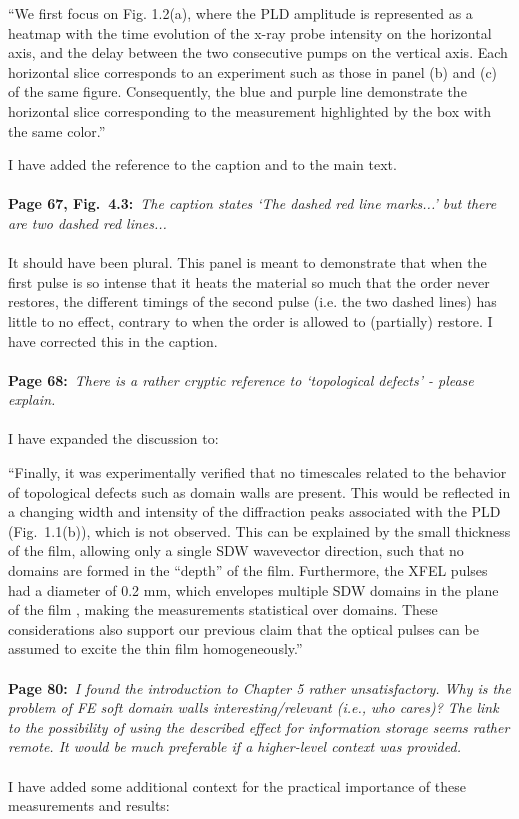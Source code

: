 \documentclass[phd, titlesmallcaps,foronline,oneside]{SNSthesis}
\begin{document}
``We first focus on Fig. 1.2(a), where
the PLD amplitude is represented as a heatmap with the time evolution of the x-ray probe intensity on the horizontal axis, and the delay between the two consecutive pumps on the vertical axis. Each horizontal slice corresponds to an experiment such as those in panel (b) and (c) of the same figure. Consequently, the blue and purple line demonstrate the horizontal slice corresponding to the measurement highlighted by the box with the same color.''

I have added the reference to the caption and to the main text.
\\\\
{\bf Page 67, Fig.~4.3:}~{\it The caption states `The dashed red line marks...’ but there are two dashed red lines...}
\\\\
It should have been plural. This panel is meant to demonstrate that when the first pulse is so intense that it heats the material so much that the order never restores, the different timings of the second pulse (i.e. the two dashed lines) has little to no effect, contrary to when the order is allowed to (partially) restore.
I have corrected this in the caption.
\\\\
{\bf Page 68:}~{\it There is a rather cryptic reference to `topological defects' - please explain.}
\\\\
I have expanded the discussion to:

``Finally, it was experimentally verified that no timescales related to the behavior of topological defects such as domain walls are present. This would be reflected in a changing width and intensity of the diffraction peaks associated with the PLD (Fig.~1.1(b)), which is not observed. This can be explained by the small thickness of the film, allowing only a single SDW wavevector direction, such that no domains are formed in the ``depth'' of the film. Furthermore, the XFEL pulses had a diameter of 0.2 mm, which envelopes multiple SDW domains in the plane of the film \cite{Nicholson2016}, making the measurements statistical over domains.
These considerations also support our previous claim that the optical pulses can be assumed to excite the thin film homogeneously.''
\\\\
{\bf Page 80:}~{\it I found the introduction to Chapter 5 rather unsatisfactory. Why is the problem of FE soft domain walls interesting/relevant (i.e., who cares)? The link to the possibility of using the described effect for information storage seems rather remote. It would be much preferable if a
higher-level context was provided.}
\\\\
I have added some additional context for the practical importance of these measurements and results:
\end{document}
